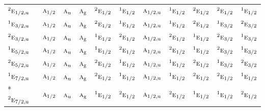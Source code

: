 \documentclass[10pt,a4paper]{article}
\numberwithin{equation}{section}
\newcommand{\irr}[1]{\text{\normalfont\scshape #1}}
\newcommand{\conjpair}[1]{{}^{#1}}
\newcommand{\ptag}[1]{\mathrm{#1}}
\begin{document}
{\begin{longtable}{@{}lcccccccccc@{}}
$\conjpair{2}\irr{e}_{1/2,\ptag{u}}$ & $\irr{a}_{1/2}$ & $\irr{a}_{\ptag{u}}$ & $\irr{a}_{\ptag{g}}$ & $\conjpair{2}\irr{e}_{1/2}$ & $\conjpair{1}\irr{e}_{1/2}$ & $\irr{a}_{1/2,\ptag{u}}$ & $\conjpair{1}\irr{e}_{1/2}$ & $\conjpair{2}\irr{e}_{1/2}$ & $\conjpair{2}\irr{e}_{1/2}$ & $\conjpair{1}\irr{e}_{1/2}$\\
$\conjpair{1}\irr{e}_{3/2,\ptag{u}}$ & $\irr{a}_{1/2}$ & $\irr{a}_{\ptag{u}}$ & $\irr{a}_{\ptag{g}}$ & $\conjpair{2}\irr{e}_{1/2}$ & $\conjpair{1}\irr{e}_{1/2}$ & $\irr{a}_{1/2,\ptag{u}}$ & $\conjpair{1}\irr{e}_{1/2}$ & $\conjpair{2}\irr{e}_{1/2}$ & $\conjpair{1}\irr{e}_{3/2}$ & $\conjpair{2}\irr{e}_{3/2}$\\
$\conjpair{2}\irr{e}_{3/2,\ptag{u}}$ & $\irr{a}_{1/2}$ & $\irr{a}_{\ptag{u}}$ & $\irr{a}_{\ptag{g}}$ & $\conjpair{1}\irr{e}_{1/2}$ & $\conjpair{2}\irr{e}_{1/2}$ & $\irr{a}_{1/2,\ptag{u}}$ & $\conjpair{2}\irr{e}_{1/2}$ & $\conjpair{1}\irr{e}_{1/2}$ & $\conjpair{2}\irr{e}_{3/2}$ & $\conjpair{1}\irr{e}_{3/2}$\\
$\conjpair{1}\irr{e}_{5/2,\ptag{u}}$ & $\irr{a}_{1/2}$ & $\irr{a}_{\ptag{u}}$ & $\irr{a}_{\ptag{g}}$ & $\conjpair{1}\irr{e}_{1/2}$ & $\conjpair{2}\irr{e}_{1/2}$ & $\irr{a}_{1/2,\ptag{u}}$ & $\conjpair{2}\irr{e}_{1/2}$ & $\conjpair{1}\irr{e}_{1/2}$ & $\conjpair{2}\irr{e}_{3/2}$ & $\conjpair{1}\irr{e}_{3/2}$\\
$\conjpair{2}\irr{e}_{5/2,\ptag{u}}$ & $\irr{a}_{1/2}$ & $\irr{a}_{\ptag{u}}$ & $\irr{a}_{\ptag{g}}$ & $\conjpair{2}\irr{e}_{1/2}$ & $\conjpair{1}\irr{e}_{1/2}$ & $\irr{a}_{1/2,\ptag{u}}$ & $\conjpair{1}\irr{e}_{1/2}$ & $\conjpair{2}\irr{e}_{1/2}$ & $\conjpair{1}\irr{e}_{3/2}$ & $\conjpair{2}\irr{e}_{3/2}$\\
$\conjpair{1}\irr{e}_{7/2,\ptag{u}}$ & $\irr{a}_{1/2}$ & $\irr{a}_{\ptag{u}}$ & $\irr{a}_{\ptag{g}}$ & $\conjpair{2}\irr{e}_{1/2}$ & $\conjpair{1}\irr{e}_{1/2}$ & $\irr{a}_{1/2,\ptag{u}}$ & $\conjpair{1}\irr{e}_{1/2}$ & $\conjpair{2}\irr{e}_{1/2}$ & $\conjpair{2}\irr{e}_{1/2}$ & $\conjpair{1}\irr{e}_{1/2}$\\*
$\conjpair{2}\irr{e}_{7/2,\ptag{u}}$ & $\irr{a}_{1/2}$ & $\irr{a}_{\ptag{u}}$ & $\irr{a}_{\ptag{g}}$ & $\conjpair{1}\irr{e}_{1/2}$ & $\conjpair{2}\irr{e}_{1/2}$ & $\irr{a}_{1/2,\ptag{u}}$ & $\conjpair{2}\irr{e}_{1/2}$ & $\conjpair{1}\irr{e}_{1/2}$ & $\conjpair{1}\irr{e}_{1/2}$ & $\conjpair{2}\irr{e}_{1/2}$\\
\bottomrule\end{longtable}}
\end{document}
